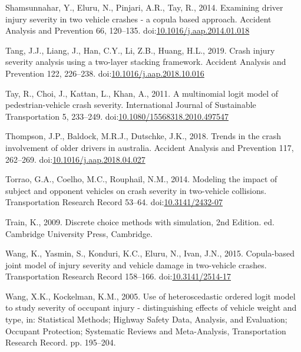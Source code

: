 \documentclass[]{elsarticle} %
\begin{document}
\leavevmode\hypertarget{ref-Shamsunnahar2014examining}{}%
Shamsunnahar, Y., Eluru, N., Pinjari, A.R., Tay, R., 2014. Examining
driver injury severity in two vehicle crashes - a copula based approach.
Accident Analysis and Prevention 66, 120--135.
doi:\href{https://doi.org/10.1016/j.aap.2014.01.018}{10.1016/j.aap.2014.01.018}

\leavevmode\hypertarget{ref-Tang2019crash}{}%
Tang, J.J., Liang, J., Han, C.Y., Li, Z.B., Huang, H.L., 2019. Crash
injury severity analysis using a two-layer stacking framework. Accident
Analysis and Prevention 122, 226--238.
doi:\href{https://doi.org/10.1016/j.aap.2018.10.016}{10.1016/j.aap.2018.10.016}

\leavevmode\hypertarget{ref-Tay2011multinomial}{}%
Tay, R., Choi, J., Kattan, L., Khan, A., 2011. A multinomial logit model
of pedestrian-vehicle crash severity. International Journal of
Sustainable Transportation 5, 233--249.
doi:\href{https://doi.org/10.1080/15568318.2010.497547}{10.1080/15568318.2010.497547}

\leavevmode\hypertarget{ref-Thompson2018trends}{}%
Thompson, J.P., Baldock, M.R.J., Dutschke, J.K., 2018. Trends in the
crash involvement of older drivers in australia. Accident Analysis and
Prevention 117, 262--269.
doi:\href{https://doi.org/10.1016/j.aap.2018.04.027}{10.1016/j.aap.2018.04.027}

\leavevmode\hypertarget{ref-Torrao2014modeling}{}%
Torrao, G.A., Coelho, M.C., Rouphail, N.M., 2014. Modeling the impact of
subject and opponent vehicles on crash severity in two-vehicle
collisions. Transportation Research Record 53--64.
doi:\href{https://doi.org/10.3141/2432-07}{10.3141/2432-07}

\leavevmode\hypertarget{ref-Train2009discrete}{}%
Train, K., 2009. Discrete choice methods with simulation, 2nd Edition.
ed. Cambridge University Press, Cambridge.

\leavevmode\hypertarget{ref-Wang2015copula}{}%
Wang, K., Yasmin, S., Konduri, K.C., Eluru, N., Ivan, J.N., 2015.
Copula-based joint model of injury severity and vehicle damage in
two-vehicle crashes. Transportation Research Record 158--166.
doi:\href{https://doi.org/10.3141/2514-17}{10.3141/2514-17}

\leavevmode\hypertarget{ref-Wang2005use}{}%
Wang, X.K., Kockelman, K.M., 2005. Use of heteroscedastic ordered logit
model to study severity of occupant injury - distinguishing effects of
vehicle weight and type, in: Statistical Methods; Highway Safety Data,
Analysis, and Evaluation; Occupant Protection; Systematic Reviews and
Meta-Analysis, Transportation Research Record. pp. 195--204.
\end{document}
